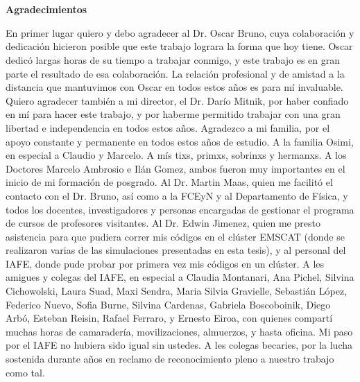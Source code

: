\pagestyle{empty}
\chapter*{}

\begin{center}
\begin{large}
\textbf{Agradecimientos}
\end{large}
\end{center}

\vspace{1cm}
En primer lugar quiero y debo agradecer al Dr. Oscar Bruno, cuya 
colaboración y dedicación hicieron posible que 
este trabajo lograra la forma que hoy tiene. Oscar dedicó largas 
horas de su tiempo a trabajar conmigo, 
y este trabajo es en gran parte el resultado de esa colaboración. 
La relación profesional y de amistad a la distancia que mantuvimos 
con Oscar en todos estos años es para mí invaluable. 
Quiero agradecer también a mi director, el Dr. Darío Mitnik, por 
haber confiado en mí para hacer este trabajo, y por haberme permitido 
trabajar con una gran libertad e independencia en todos estos años. 
Agradezco a mi familia, por el apoyo constante y permanente 
en todos estos años de estudio. A la familia Osimi, en especial a 
Claudio y Marcelo. A mís tixs, primxs, sobrinxs y hermanxs.
A los Doctores Marcelo Ambrosio e Ilán Gomez, 
ambos fueron muy importantes en el inicio de mi formación de posgrado. 
Al Dr. Martin Maas, quien me facilitó el contacto con el Dr. Bruno, 
así como a la FCEyN y al Departamento de Física, y todos los docentes, 
investigadores y personas encargadas de gestionar el programa de cursos de profesores visitantes. 
Al Dr. Edwin 
Jimenez, quien me presto asistencia para que pudiera correr mis códigos 
en el clúster EMSCAT (donde se realizaron varias de las simulaciones 
presentadas en esta tesis), y al personal del IAFE, 
donde pude probar por primera vez mis códigos en un clúster.
 A les amigues y colegas del IAFE, en especial a 
Claudia Montanari, Ana Pichel, Silvina Cichowolski, Laura Suad, Maxi Sendra, Maria Silvia Gravielle, Sebastián López, 
Federico Nuevo, Sofia Burne, Silvina Cardenas, Gabriela Boscoboinik, Diego Arbó, Esteban Reisin, Rafael Ferraro,  y Ernesto Eiroa, con quienes 
compartí muchas horas de camaradería, movilizaciones, almuerzos, y hasta oficina. 
Mi paso por el IAFE no hubiera sido igual sin ustedes. 
A les colegas becaries, por la lucha sostenida durante años en reclamo de 
reconocimiento pleno a nuestro trabajo como tal. 
